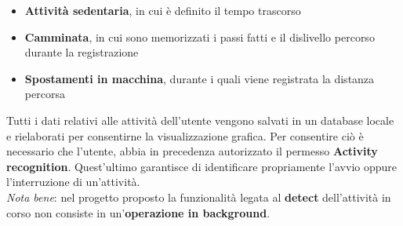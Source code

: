 \documentclass{article}
\begin{document}
    \begin{itemize}
        \renewcommand{\labelitemi}{-}
        \item \textbf{Attività sedentaria}, in cui è definito il tempo trascorso
        \item \textbf{Camminata}, in cui sono memorizzati i passi fatti e il dislivello percorso durante la registrazione
        \item \textbf{Spostamenti in macchina}, durante i quali viene registrata la distanza percorsa
    \end{itemize}
    Tutti i dati relativi alle attività dell'utente vengono salvati in un database locale e rielaborati per consentirne la visualizzazione grafica. Per consentire ciò è necessario che l'utente, abbia in precedenza autorizzato il permesso \textbf{Activity recognition}. Quest'ultimo garantisce di identificare propriamente l'avvio oppure l'interruzione di un'attività. \vspace*{7pt}\\
    \textit{Nota bene}: nel progetto proposto la funzionalità legata al \textbf{detect} dell'attività in corso non consiste in un'\textbf{operazione in background}.
\end{document}
